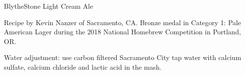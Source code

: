 \begin{recipe}{BlytheStone Light Cream Ale}

\begin{aboutblock}
Recipe by Kevin Nanzer of Sacramento, CA. Bronze medal in Category 1: Pale American
Lager during the 2018 National Homebrew Competition in Portland, OR. \sourceaha
\end{aboutblock}


\begin{methodandtiming}

\begin{mashsteps}
\end{mashsteps}

\begin{fermentationsteps}
\end{fermentationsteps}

\begin{directions}
Water adjustment: use carbon filtered Sacramento City tap water with
 calcium sulfate,  calcium chloride and 
lactic acid in the mash.
\end{directions}

\end{methodandtiming}

\recipebreak

\begin{ingredientsblock}

\begin{malts}
\end{malts}

\begin{hops}
\end{hops}


\end{ingredientsblock}

\end{recipe}

